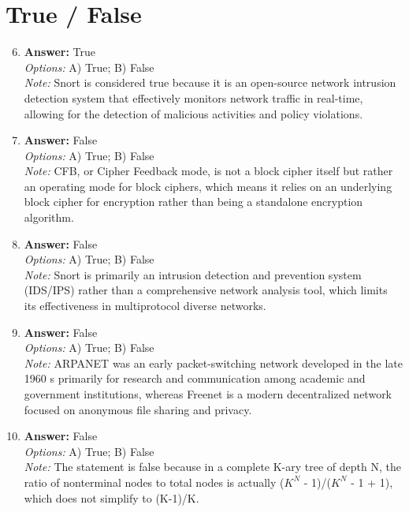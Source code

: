 \documentclass[12pt]{article}
\begin{document}
\section*{True / False}
\begin{enumerate}[label=\arabic*.]
\setcounter{enumi}{5}
\item \textbf{Answer:} True
\\ \textit{Options:} A) True; B) False
\\ \textit{Note:} Snort is considered true because it is an open-source network intrusion detection system that effectively monitors network traffic in real-time, allowing for the detection of malicious activities and policy violations.
\item \textbf{Answer:} False
\\ \textit{Options:} A) True; B) False
\\ \textit{Note:} CFB, or Cipher Feedback mode, is not a block cipher itself but rather an operating mode for block ciphers, which means it relies on an underlying block cipher for encryption rather than being a standalone encryption algorithm.
\item \textbf{Answer:} False
\\ \textit{Options:} A) True; B) False
\\ \textit{Note:} Snort is primarily an intrusion detection and prevention system (IDS/IPS) rather than a comprehensive network analysis tool, which limits its effectiveness in multiprotocol diverse networks.
\item \textbf{Answer:} False
\\ \textit{Options:} A) True; B) False
\\ \textit{Note:} ARPANET was an early packet-switching network developed in the late 1960 s primarily for research and communication among academic and government institutions, whereas Freenet is a modern decentralized network focused on anonymous file sharing and privacy.
\item \textbf{Answer:} False
\\ \textit{Options:} A) True; B) False
\\ \textit{Note:} The statement is false because in a complete K-ary tree of depth N, the ratio of nonterminal nodes to total nodes is actually ($K^N$ - 1)/($K^N$ - 1 + 1), which does not simplify to (K-1)/K.
\end{enumerate}
\end{document}
